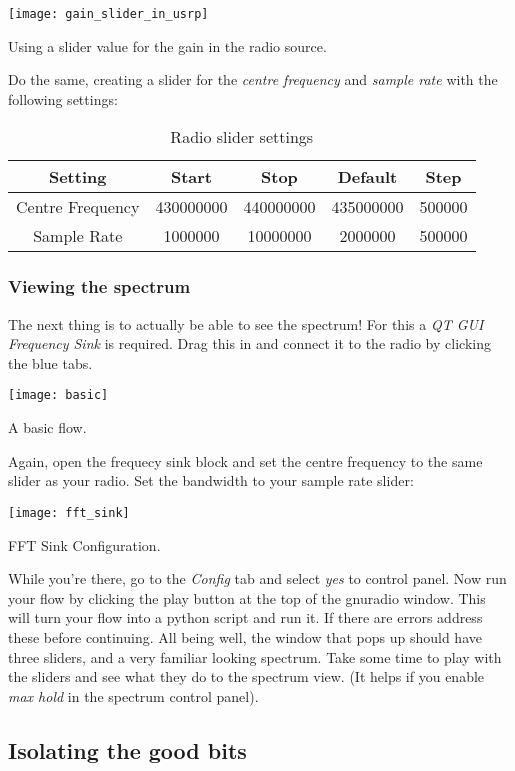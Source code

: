 \centrefigurestart
\texttt{[image: gain\_slider\_in\_usrp]}
\caption{Using a slider value for the gain in the radio source.}
\centrefigureend

Do the same, creating a slider for the \textit{centre frequency} and \textit{sample rate} with the following settings:

\begin{table}[H]
\begin{tabular}{|c|c|c|c|c|}
\hline
Setting & Start & Stop & Default & Step \\ \hline
Centre Frequency & 430000000 & 440000000 & 435000000 & 500000 \\ \hline
Sample Rate & 1000000 & 10000000 & 2000000 & 500000 \\ \hline
\end{tabular}
\caption{Radio slider settings}
\end{table}

\subsubsection{Viewing the spectrum}
The next thing is to actually be able to see the spectrum! For this a \textit{QT GUI Frequency Sink} is required. Drag this in and connect it to the radio by clicking the blue tabs.

\centrefigurestart
\texttt{[image: basic]}
\caption{A basic flow.}
\centrefigureend

Again, open the frequecy sink block and set the centre frequency to the same slider as your radio. Set the bandwidth to your sample rate slider:

\centrefigurestart
\texttt{[image: fft\_sink]}
\caption{FFT Sink Configuration.}
\centrefigureend

While you're there, go to the \textit{Config} tab and select \textit{yes} to control panel. Now run your flow by clicking the play button at the top of the gnuradio window. This will turn your flow into a python script and run it. If there are errors address these before continuing. All being well, the window that pops up should have three sliders, and a very familiar looking spectrum. Take some time to play with the sliders and see what they do to the spectrum view. (It helps if you enable \textit{max hold} in the spectrum control panel). 

\subsection{Isolating the good bits}


